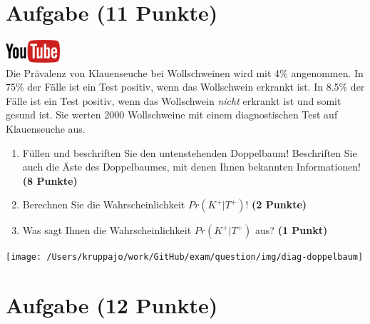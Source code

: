 \documentclass[a4paper, 9pt]{scrartcl}\usepackage[]{graphicx}\usepackage[]{xcolor}
\begin{document}
\clearpage

\section{Aufgabe \hfill (11 Punkte)}

\hfill\href{https://youtu.be/VQlNl8hvRII}{\includegraphics[width =
  2cm]{img/youtube}}\\[1Ex]


Die Pr{\"a}valenz von Klauenseuche bei Wollschweinen wird mit
4\% angenommen. In 75\% der F{\"a}lle ist ein Test positiv, wenn das Wollschwein erkrankt
ist. In 8.5\% der F{\"a}lle ist ein Test positiv,
wenn das Wollschwein \textit{nicht} erkrankt ist und somit gesund ist. Sie
werten 2000 Wollschweine mit einem
diagnostischen Test auf Klauenseuche aus.



\begin{enumerate}
\item F{\"u}llen und beschriften Sie den untenstehenden Doppelbaum! Beschriften
  Sie auch die {\"A}ste des Doppelbaumes, mit denen Ihnen bekannten
  Informationen!  \textbf{(8 Punkte)}
\item Berechnen Sie die Wahrscheinlichkeit $Pr(K^+|T^+)$! \textbf{(2 Punkte)}
\item Was sagt Ihnen die Wahrscheinlichkeit $Pr(K^+|T^+)$ aus? \textbf{(1 Punkt)}
\end{enumerate}

\vspace{1cm}

\begin{center}
  \texttt{[image: /Users/kruppajo/work/GitHub/exam/question/img/diag-doppelbaum]}
\end{center}



 
\clearpage

\section{Aufgabe \hfill (12 Punkte)}
\end{document}
